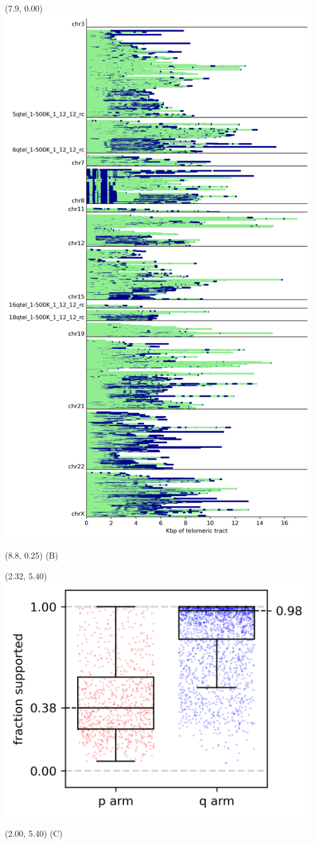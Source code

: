\documentclass{article}
\begin{document}
\begin{textblock}{13}(7.9,  0.00) \includegraphics{shortread-support/Figure-support-SXB.png}   \end{textblock}
\begin{textblock}{13}(8.8,  0.25) \LARGE{(B)} \end{textblock}

\begin{textblock}{13}(2.32,  5.40) \includegraphics{shortread-support/Figure-support-SXC.png}   \end{textblock}
\begin{textblock}{13}(2.00,  5.40) \LARGE{(C)} \end{textblock}
\end{document}
